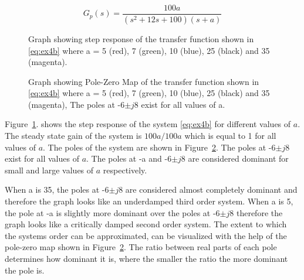 \renewcommand{\ex}{ex4b} 

\begin{equation}
	G_{p}\left(s\right)=\frac{100a}{\left(s^2 + 12s + 100\right)\left(s+a\right)}
	\label{eq:\ex}
\end{equation}

\begin{figure}[ht!]
    \centering
    
    \caption{Graph showing step response of the transfer function shown in \eqref{eq:\ex} where a = 5 (red), 7 (green), 10 (blue), 25 (black) and 35 (magenta).\appendixamble{\ex}}
    \label{fig:\ex}
\end{figure}\FloatBarrier

\begin{figure}[ht!]
    \centering
    
    \caption{Graph showing Pole-Zero Map of the transfer function shown in \eqref{eq:\ex} where a = 5 (red), 7 (green), 10 (blue), 25 (black) and 35 (magenta), The poles at -6$\pm j8$ exist for all values of a. \appendixamble{\ex}}
    \label{fig:\ex_2}
\end{figure}\FloatBarrier

Figure~\ref{fig:\ex}. shows the step response of the system \eqref{eq:\ex} for different values of $a$. The steady state gain of the system is $100a/100a$ which is equal to 1 for all values of $a$. The poles of the system are shown in Figure~\ref{fig:\ex_2}. The poles at -6$\pm j8$ exist for all values of $a$. The poles at -a and -6$\pm j8$ are considered dominant for small and large values of $a$ respectively. 

When a is 35, the poles at -6$\pm j8$ are considered almost completely dominant and therefore the graph looks like an underdamped third order system. When a is 5, the pole at -a is slightly more dominant over the poles at -6$\pm j8$ therefore the graph looks like a critically damped second order system. The extent to which the systems order can be approximated, can be visualized with the help of the pole-zero map shown in Figure~\ref{fig:\ex_2}. The ratio between real parts of each pole determines how dominant it is, where the smaller the ratio the more dominant the pole is. 
